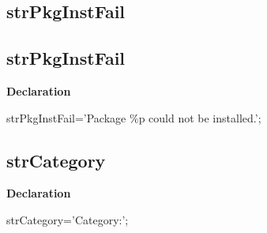 \documentclass{report}
\newif\ifpdf
\begin{document}
\subsection*{\large{\textbf{strPkgInstFail}}\normalsize\hspace{1ex}\hrulefill}
\else
\subsection*{strPkgInstFail}
\fi
\label{trstrings-strPkgInstFail}
\begin{list}{}{
\setlength{\itemindent}{0cm}
\setlength{\listparindent}{0cm}
\setlength{\leftmargin}{\evensidemargin}
\addtolength{\leftmargin}{\tmplength}
\settowidth{\labelsep}{X}
\addtolength{\leftmargin}{\labelsep}
\setlength{\labelwidth}{\tmplength}
}
\item[\textbf{Declaration}\hfill]
\ifpdf
\begin{flushleft}
\fi
\begin{ttfamily}
strPkgInstFail='Package {\%}p could not be installed.';\end{ttfamily}

\ifpdf
\end{flushleft}
\fi

\end{list}
\ifpdf
\subsection*{\large{\textbf{strCategory}}\normalsize\hspace{1ex}\hrulefill}
\else
\subsection*{strCategory}
\fi
\label{trstrings-strCategory}
\begin{list}{}{
\setlength{\itemindent}{0cm}
\setlength{\listparindent}{0cm}
\setlength{\leftmargin}{\evensidemargin}
\addtolength{\leftmargin}{\tmplength}
\settowidth{\labelsep}{X}
\addtolength{\leftmargin}{\labelsep}
\setlength{\labelwidth}{\tmplength}
}
\item[\textbf{Declaration}\hfill]
\ifpdf
\begin{flushleft}
\fi
\begin{ttfamily}
strCategory='Category:';\end{ttfamily}

\ifpdf
\end{flushleft}
\fi

\end{list}
\ifpdf
\end{document}
